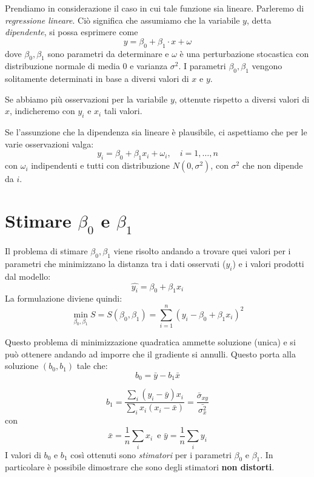 \documentclass[]{book}
\begin{document}
Prendiamo in considerazione il caso in cui tale funzione sia lineare. Parleremo di \emph{regressione lineare}. Ciò significa che assumiamo che la variabile \(y\), detta \emph{dipendente}, si possa esprimere come
\[
y = \beta_0 + \beta_1 \cdot x + \omega
\]
dove \(\beta_0, \beta_1\) sono parametri da determinare e \(\omega\) è una perturbazione stocastica con distribuzione normale di media 0 e varianza \(\sigma^2\). I parametri \(\beta_0, \beta_1\) vengono solitamente determinati in base a diversi valori di \(x\) e \(y\).

Se abbiamo più osservazioni per la variabile \(y\), ottenute rispetto a diversi valori di \(x\), indicheremo con \(y_i\) e \(x_i\) tali valori.

Se l'assunzione che la dipendenza sia lineare è plausibile, ci aspettiamo che per le varie osservazioni valga:
\[
y_i = \beta_0 + \beta_1 x_i + \omega_i, \quad i= 1, \dots , n
\]
con \(\omega_i\) indipendenti e tutti con distribuzione \(N(0,\sigma^2)\), con \(\sigma^2\) che non dipende da \(i\).

\hypertarget{stimare-beta_0-e-beta_1}{%
\section{\texorpdfstring{Stimare \(\beta_0\) e \(\beta_1\)}{Stimare \textbackslash{}beta\_0 e \textbackslash{}beta\_1}}\label{stimare-beta_0-e-beta_1}}

Il problema di stimare \(\beta_0, \beta_1\) viene risolto andando a trovare quei valori per i parametri che minimizzano la distanza tra i dati osservati (\(y_i\)) e i valori prodotti dal modello:
\[
\hat{y_i} = \beta_0 + \beta_1 x_i
\]
La formulazione diviene quindi:
\[
\min_{\beta_0, \beta_1 } S = S(\beta_0, \beta_1 ) = \sum_{i=1}^n \left( y_i - \beta_0 + \beta_1 x_i \right)^2
\]

Questo problema di minimizzazione quadratica ammette soluzione (unica) e si può ottenere andando ad imporre che il gradiente si annulli. Questo porta alla soluzione \((b_0, b_1)\) tale che:
\[
b_0  = \bar{y} - b_1 \bar{x}
\]

\[
b_1 = \frac{\sum_i (y_i - \bar{y}) x_i}{\sum_i x_i (x_i - \bar{x})} = \frac{\bar{\sigma}
_{x y }} {\bar{\sigma_{x}^2}}
\]
con
\[
 \bar{x} = \frac{1}{n} \sum_i x_i \, \text{ e } \bar{y} = \frac{1}{n} \sum_i y_i
\]
I valori di \(b_0\) e \(b_1\) così ottenuti sono \emph{stimatori} per i parametri \(\beta_0\) e \(\beta_1\). In particolare è possibile dimostrare che sono degli stimatori \textbf{non distorti}.
\end{document}
